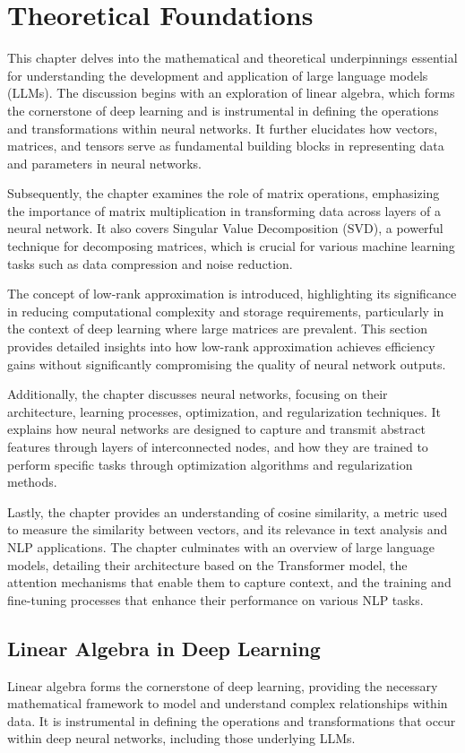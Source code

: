 \chapter{Theoretical Foundations}\label{chap:theoretical_foundations}
This chapter delves into the mathematical and theoretical underpinnings essential for understanding the development and application of large language models (LLMs). The discussion begins with an exploration of linear algebra, which forms the cornerstone of deep learning and is instrumental in defining the operations and transformations within neural networks. It further elucidates how vectors, matrices, and tensors serve as fundamental building blocks in representing data and parameters in neural networks. 

Subsequently, the chapter examines the role of matrix operations, emphasizing the importance of matrix multiplication in transforming data across layers of a neural network. It also covers Singular Value Decomposition (SVD), a powerful technique for decomposing matrices, which is crucial for various machine learning tasks such as data compression and noise reduction.

The concept of low-rank approximation is introduced, highlighting its significance in reducing computational complexity and storage requirements, particularly in the context of deep learning where large matrices are prevalent. This section provides detailed insights into how low-rank approximation achieves efficiency gains without significantly compromising the quality of neural network outputs.

Additionally, the chapter discusses neural networks, focusing on their architecture, learning processes, optimization, and regularization techniques. It explains how neural networks are designed to capture and transmit abstract features through layers of interconnected nodes, and how they are trained to perform specific tasks through optimization algorithms and regularization methods.

Lastly, the chapter provides an understanding of cosine similarity, a metric used to measure the similarity between vectors, and its relevance in text analysis and NLP applications. The chapter culminates with an overview of large language models, detailing their architecture based on the Transformer model, the attention mechanisms that enable them to capture context, and the training and fine-tuning processes that enhance their performance on various NLP tasks.

\section{Linear Algebra in Deep Learning}
Linear algebra forms the cornerstone of deep learning, providing the necessary mathematical framework to model and understand complex relationships within data. It is instrumental in defining the operations and transformations that occur within deep neural networks, including those underlying LLMs.

